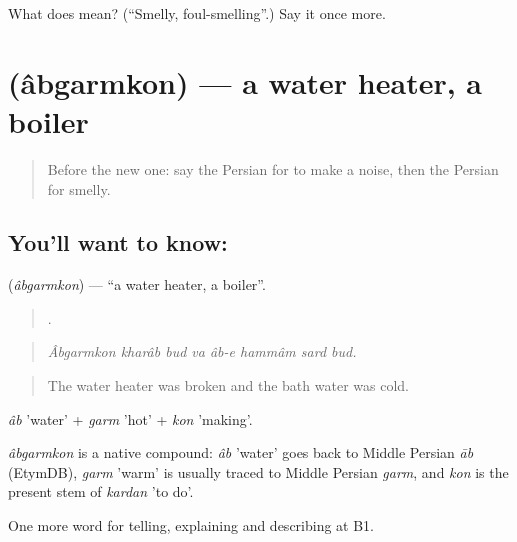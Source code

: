 \begin{tcolorbox}[breakable,colback=teal!4,colframe=teal!35!black,title={Before you move on}]
What does  mean? (\textquotedblleft{}Smelly, foul-smelling\textquotedblright{}.) Say it once more.
\end{tcolorbox}
\section[\texorpdfstring{\fa{آب} \fa{گرمکن} (âbgarmkon)}{آب گرمکن (âbgarmkon)}]{  (âbgarmkon) — a water heater, a boiler}

\label{lesson:FA-C440-abgarmkon}



\begin{quote}
Before the new one: say the Persian for to make a noise, then the Persian for smelly.
\end{quote}

\subsection*{You'll want to know:  }
\textbf{ } (\emph{âbgarmkon}) — \textquotedblleft{}a water heater, a boiler\textquotedblright{}.

\begin{quote}
        .
\end{quote}

\begin{quote}
\emph{Âbgarmkon kharâb bud va âb-e hammâm sard bud.}
\end{quote}

\begin{quote}
The water heater was broken and the bath water was cold.
\end{quote}

\emph{âb} 'water' + \emph{garm} 'hot' + \emph{kon} 'making'.

\begin{cousinweb}
\emph{âbgarmkon} is a native compound: \emph{âb} 'water' goes back to Middle Persian \emph{āb} (EtymDB), \emph{garm} 'warm' is usually traced to Middle Persian \emph{garm}, and \emph{kon} is the present stem of \emph{kardan} 'to do'.
\end{cousinweb}

\begin{grammarlens}[title={What you've built}]
One more word for telling, explaining and describing at B1.
\end{grammarlens}

